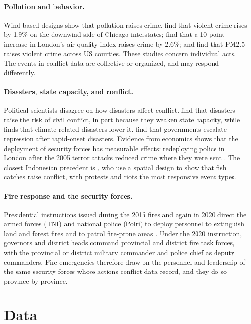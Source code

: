\documentclass[12pt]{article}
\begin{document}
\paragraph{Pollution and behavior.} Wind-based designs show that pollution raises crime. \citet{herrnstadt2021} find that violent crime rises by 1.9\% on the downwind side of Chicago interstates; \citet{bondyrothsager2020} find that a 10-point increase in London's air quality index raises crime by 2.6\%; and \citet{burkhardt2019} find that PM2.5 raises violent crime across US counties. These studies concern individual acts. The events in conflict data are collective or organized, and may respond differently.

\paragraph{Disasters, state capacity, and conflict.} Political scientists disagree on how disasters affect conflict. \citet{nelrigharts2008} find that disasters raise the risk of civil conflict, in part because they weaken state capacity, while \citet{slettebak2012} finds that climate-related disasters lower it. \citet{woodwright2016} find that governments escalate repression after rapid-onset disasters. Evidence from economics shows that the deployment of security forces has measurable effects: redeploying police in London after the 2005 terror attacks reduced crime where they were sent \citep{dracamachinwitt2011}. The closest Indonesian precedent is \citet{lu2023fish}, who use a spatial design to show that fish catches raise conflict, with protests and riots the most responsive event types.

\paragraph{Fire response and the security forces.} Presidential instructions issued during the 2015 fires and again in 2020 direct the armed forces (TNI) and national police (Polri) to deploy personnel to extinguish land and forest fires and to patrol fire-prone areas \citep{inpres11_2015, inpres3_2020}. Under the 2020 instruction, governors and district heads command provincial and district fire task forces, with the provincial or district military commander and police chief as deputy commanders. Fire emergencies therefore draw on the personnel and leadership of the same security forces whose actions conflict data record, and they do so province by province.

\section{Data}
\label{sec:data}
\end{document}
